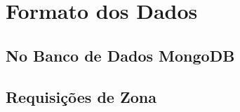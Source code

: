 \chapter{Formato dos Dados}\label{chp:fd}







\section{No Banco de Dados MongoDB}








\section{Requisições de Zona}


	